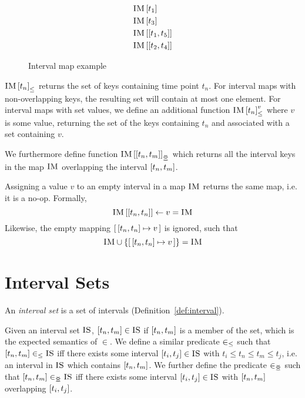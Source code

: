 \begin{figure}[h]
  \begin{align*}
    & \lookup{\map{IM}}{t_1} \\
    & \lookup{\map{IM}}{t_3} \\
    & \lookup{\map{IM}}{\interval{t_1}{t_5}} \\
    & \lookup{\map{IM}}{\interval{t_2}{t_4}}
  \end{align*}
  \caption{Interval map example}
  \label{ex:interval-map}
\end{figure}

${\textsc{IM} \left[ t_n \right]}_{\leq}$ returns the set of keys containing time point $t_n$. For interval maps with non-overlapping keys, the resulting set will contain at most one element. For interval maps with set values, we define an additional function ${\textsc{IM} \left[ t_n \right]^{v}_{\leq}}$ where $v$ is some value, returning the set of the keys containing $t_n$ and associated with a set containing $v$. 

We furthermore define function $\overlapping{\map{IM}}{t_n}{t_m}$ which returns all the interval keys in the map $\textsc{IM}$ overlapping the interval $\interval{t_n}{t_m}$. 

Assigning a value $v$ to an empty interval in a map $\textsc{IM}$ returns the same map, i.e. it is a no-op. Formally,
\[
  \lookup{\map{IM}}{\interval{t_n}{t_n}} \assign v = \map{IM}
\]
Likewise, the empty mapping $\intervalmapping{t_n}{t_n}{v}$ is ignored, such that
\[
  \map{IM} \cup \set{\intervalmapping{t_n}{t_n}{v}} = \map{IM}
\]

\section{Interval Sets}
\label{sec:interval-sets}

\begin{definition}
  An \emph{interval set} is a set of intervals (Definition~\vref{def:interval}). 
\end{definition}

Given an interval set $\textsc{IS}$, $\interval{t_n}{t_m} \in \map{IS}$ if $\interval{t_n}{t_m}$ is a member of the set, which is the expected semantics of $\in$. We define a similar predicate $\in_\leq$ such that $\interval{t_n}{t_m} \inn \map{IS}$ iff there exists some interval $\interval{t_i}{t_j} \in \map{IS}$ with $t_i \leq t_n \leq t_m \leq t_j$, i.e. an interval in $\textsc{IS}$ which contains $\interval{t_n}{t_m}$. We further define the predicate $\in_{\leq\!\!\!\!\geq{}}$ such that $\interval{t_n}{t_m} \innr \map{IS}$ iff there exists some interval $\interval{t_i}{t_j} \in \map{IS}$ with $\interval{t_n}{t_m}$ overlapping $\interval{t_i}{t_j}$. 

